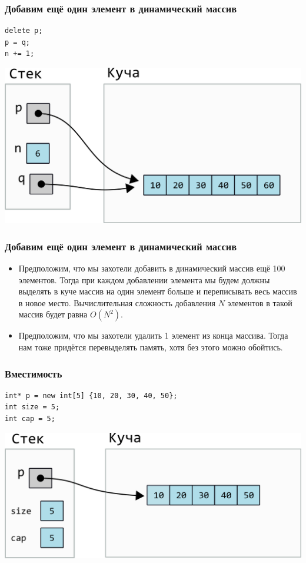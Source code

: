 \documentclass[10pt,pdf,hyperref={unicode}]{beamer}
\begin{document}
\begin{frame}[fragile]
\frametitle{Добавим ещё один элемент в динамический массив} 
\begin{lstlisting}
delete p;
p = q;
n += 1;
\end{lstlisting}
\begin{center}
\includegraphics[scale=0.6]{images/dynamic_array/dynamic_array_add_one3.png}
\end{center}
\end{frame}

\begin{frame}[fragile]
\frametitle{Добавим ещё один элемент в динамический массив} 
\begin{itemize}
\item Предположим, что мы захотели добавить в динамический массив ещё 100 элементов.
Тогда при каждом добавлении элемента мы будем должны выделять в куче массив на один элемент больше и переписывать весь массив в новое место. 
Вычислительная сложность добавления $N$ элементов в такой массив будет равна $O(N^2)$.
\item Предположим, что мы захотели удалить 1 элемент из конца массива. Тогда нам тоже придётся перевыделять память, хотя без этого можно обойтись.
\end{itemize}
\end{frame}


\begin{frame}[fragile]
\frametitle{Вместимость} 
\begin{lstlisting}
int* p = new int[5] {10, 20, 30, 40, 50};
int size = 5;
int cap = 5;
\end{lstlisting}
\begin{center}
\includegraphics[scale=0.6]{images/dynamic_array/dynamic_array_cap.png}
\end{center}
\end{frame}
\end{document}
